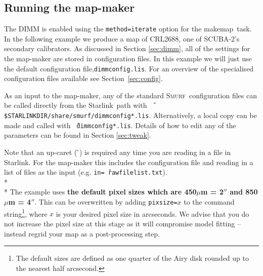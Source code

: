 \documentclass[twoside,11pt]{article}
\newcommand{\htmladdnormallink}[2]{#1}
\newcommand{\xref}[3]{#1}
\newcommand{\xlabel}[1]{}
\renewcommand{\_}{\texttt{\symbol{95}}}
\newcommand{\starlink}{\htmladdnormallink{Starlink}{http://starlink.jach.hawaii.edu}}
\newcommand{\smurf}{\xref{\textsc{Smurf}}{sun258}{}}
\newcommand{\task}[1]{\textsf{#1}}
\newcommand{\makemap}{\xref{\task{makemap}}{sun258}{MAKEMAP}}
\begin{document}
\subsection{\xlabel{running_dimm}Running the map-maker}

The DIMM is enabled using the \texttt{method=iterate} option for the \makemap\ task. In the following example we produce a map of CRL2688, one of SCUBA-2's secondary calibrators. As discussed in Section \ref{sec:dimm}, all of the settings for the map-maker are stored in configuration files.  In this example we will just use the default configuration file,\texttt{dimmconfig.lis}. For an overview of the specialised configuration files available see Section~\ref{sec:config}. 

As an input to the map-maker, any of the standard \smurf\ configuration files can be called directly from the \starlink\ path with \texttt{\^\,\$STARLINK\_DIR/share/smurf/dimmconfig*.lis}. Alternatively, a local copy can be made and called with \texttt{\^\,dimmconfig*.lis}. Details of how to edit any of the parameters can be found in Section \ref{sec:tweak}. 

Note that an up-caret (\,\^\,) is required any time you are reading in a file in \starlink. For the map-maker this includes the configuration file and reading in a list of files as the input (e.g. \texttt{in=\^\,rawfilelist.txt}).
\\*\\*
The example uses \textbf{the default pixel sizes which are 450$\mu$m = 2$''$ and 850$\mu$m = 4$''$}. This can be overwritten by adding \texttt{pixsize=}$x$ to the command string\footnote{The default sizes are defined as one  quarter of the Airy disk rounded up to the nearest half arcsecond.}, where $x$ is your desired pixel size in arcseconds. We advise that you do not increase the pixel size at this stage as it will compromise model fitting -- instead regrid your map as a post-processing step.
\end{document}
